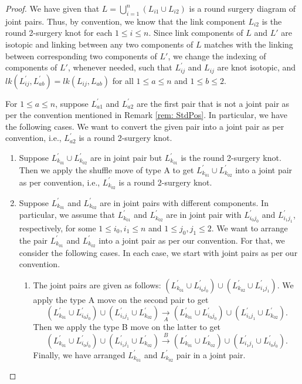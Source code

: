 \documentclass{amsart}
\theoremstyle{plain}
\theoremstyle{remark}
\theoremstyle{definition}
\begin{document}
\begin{proof}
We have given that $L = \bigcup_{i=1}^{n}(L_{i1}\cup L_{i2})$ is a round surgery diagram of joint pairs. Thus, by convention, we know that the link component $L_{i2}$ is the round 2-surgery knot for each $1\leq i\leq n$.
Since link components of $L$ and $L'$ are isotopic and linking between any two components of $L$ matches with the linking between corresponding two components of $L'$, we change the indexing of components of $L'$, whenever needed, such that $L^{\prime}_{ij}$ and $L_{ij}$ are knot isotopic, and $lk(L^{\prime}_{ij}, L^{\prime}_{ab}) = lk(L_{ij}, L_{ab})$ for all $1\leq a\leq n $ and $1\leq b\leq 2$.

For $1\leq a \leq n$, suppose $L^{\prime}_{a1}$ and $L^{\prime}_{a2}$ are the first pair that is not a joint pair as per the convention mentioned in Remark \ref{rem: StdPos}. 
In particular, we have the following cases. We want to convert the given pair into a joint pair as per convention, i.e., $L^{\prime}_{a2}$ is a round 2-surgery knot.
\begin{enumerate}
    \item Suppose $L^{\prime}_{k_01}\cup L^{\prime}_{k_02}$ are in joint pair but $L^{\prime}_{k_01}$ is the round 2-surgery knot.
    Then we apply the shuffle move of type A to get $L^{\prime}_{k_01}\cup L^{\prime}_{k_02}$ into a joint pair as per convention, i.e., $L^{\prime}_{k_02}$ is a round 2-surgery knot. 
    \item Suppose $L^{\prime}_{k_01}$ and $L^{\prime}_{k_02}$ are in joint pairs with different components. 
    In particular, we assume that $L^{\prime}_{k_01}$ and $L^{\prime}_{k_02}$ are in joint pair with $L^{\prime}_{i_0j_0}$ and $L^{\prime}_{i_1j_1}$, respectively, for some $1\leq i_0,i_1\leq n$ and $1\leq j_0, j_1 \leq 2$.
    We want to arrange the pair $L^{\prime}_{k_01}$ and $L^{\prime}_{k_02}$ into a joint pair as per our convention. For that, we consider the following cases. 
    In each case, we start with joint pairs as per our convention.
    \begin{enumerate}
        \item [Case 1.] The joint pairs are given as follows: $(L^{\prime}_{k_01} \cup L^{\prime}_{i_0j_0}) \cup (L^{\prime}_{k_02}\cup L^{\prime}_{i_1j_1})$.  
        We apply the type A move on the second pair to get 
        $$(L^{\prime}_{k_01} \cup L^{\prime}_{i_0j_0}) \cup ( L^{\prime}_{i_1j_1}\cup L^{\prime}_{k_02}) \xrightarrow[A]{} (L^{\prime}_{k_01} \cup L^{\prime}_{i_0j_0}) \cup ( L^{\prime}_{i_1j_1}\cup L^{\prime}_{k_02}). $$
        Then we apply the type B move on the latter to get
        $$ (L^{\prime}_{k_01} \cup L^{\prime}_{i_0j_0}) \cup ( L^{\prime}_{i_1j_1}\cup L^{\prime}_{k_02})\xrightarrow[]{B}(L^{\prime}_{k_01} \cup L^{\prime}_{k_02}) \cup ( L^{\prime}_{i_1j_1}\cup L^{\prime}_{i_0j_0}).$$ 
        Finally, we have arranged $L^{\prime}_{k_01}$ and $L^{\prime}_{k_02}$ pair in a joint pair.


\end{enumerate}
\end{enumerate}
\end{proof}
\end{document}
